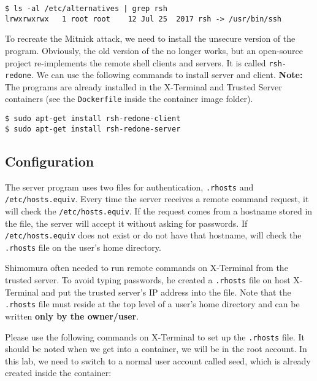 \begin{lstlisting}
$ ls -al /etc/alternatives | grep rsh
lrwxrwxrwx   1 root root    12 Jul 25  2017 rsh -> /usr/bin/ssh
\end{lstlisting}


To recreate the Mitnick attack, we need to install the unsecure version
of the \rsh program. Obviously, the old version of 
the \rsh no longer works, but an open-source project
re-implements the remote shell clients and servers. 
It is called \texttt{rsh-redone}. 
We can use the following commands to install \rsh server and client. 
\textbf{Note:} The \rsh programs are already installed in  
the X-Terminal and Trusted Server containers (see the \texttt{Dockerfile} 
inside the container image folder). 

\begin{lstlisting}
$ sudo apt-get install rsh-redone-client
$ sudo apt-get install rsh-redone-server
\end{lstlisting}




\subsection{Configuration}
\label{subsec:configuration}

The \rsh server program uses two files for authentication, 
\texttt{.rhosts} and \texttt{/etc/hosts.equiv}.
Every time the server receives a remote command request, it will check
the \texttt{/etc/hosts.equiv}. If the request comes from a hostname stored in the file, the
server will accept it without asking for passwords. 
If \texttt{/etc/hosts.equiv} does not exist or
do not have that hostname, \rsh  will check the \texttt{.rhosts} file 
on the user's home directory. 

Shimomura often needed to run remote commands on X-Terminal
from the trusted server. To avoid typing passwords, he
created a \texttt{.rhosts} file on host X-Terminal and put the trusted
server's IP address into the file.
Note that the \texttt{.rhosts} file must reside at the top level of a user's home directory and
can be written \textbf{only by the owner/user}.


Please use the following commands on X-Terminal to set up the \texttt{.rhosts} file.
It should be noted when we get into a container, we will be in the root 
account. In this lab, we need to switch to a normal user account called seed, which
is already created inside the container: 


